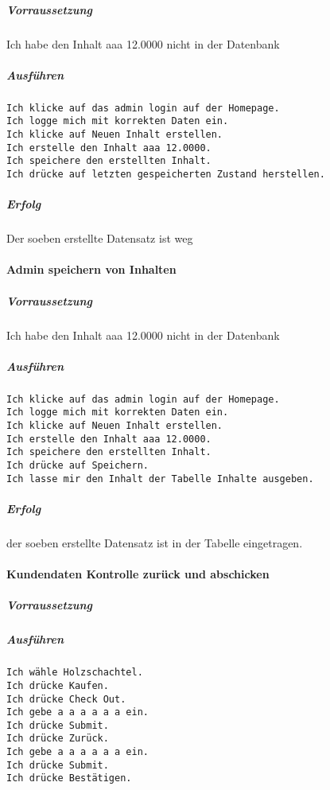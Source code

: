\documentclass[a4paper, 11pt]{article}
\begin{document}
\subparagraph{Vorraussetzung}

Ich habe den Inhalt aaa 12.0000 nicht in der Datenbank

\subparagraph{Ausführen}

\begin{verbatim}
Ich klicke auf das admin login auf der Homepage.
Ich logge mich mit korrekten Daten ein.
Ich klicke auf Neuen Inhalt erstellen.
Ich erstelle den Inhalt aaa 12.0000.
Ich speichere den erstellten Inhalt.
Ich drücke auf letzten gespeicherten Zustand herstellen.
\end{verbatim}

\subparagraph{Erfolg}

Der soeben erstellte Datensatz ist weg

\paragraph{Admin speichern von Inhalten}

\subparagraph{Vorraussetzung}

Ich habe den Inhalt aaa 12.0000 nicht in der Datenbank

\subparagraph{Ausführen}

\begin{verbatim}
Ich klicke auf das admin login auf der Homepage.
Ich logge mich mit korrekten Daten ein.
Ich klicke auf Neuen Inhalt erstellen.
Ich erstelle den Inhalt aaa 12.0000.
Ich speichere den erstellten Inhalt.
Ich drücke auf Speichern.
Ich lasse mir den Inhalt der Tabelle Inhalte ausgeben.
\end{verbatim}

\subparagraph{Erfolg}

der soeben erstellte Datensatz ist in der Tabelle eingetragen.

\paragraph{Kundendaten Kontrolle zurück und abschicken}

\subparagraph{Vorraussetzung}

\subparagraph{Ausführen}

\begin{verbatim}
Ich wähle Holzschachtel.
Ich drücke Kaufen.
Ich drücke Check Out.
Ich gebe a a a a a a ein.
Ich drücke Submit.
Ich drücke Zurück.
Ich gebe a a a a a a ein.
Ich drücke Submit.
Ich drücke Bestätigen.
\end{verbatim}
\end{document}
